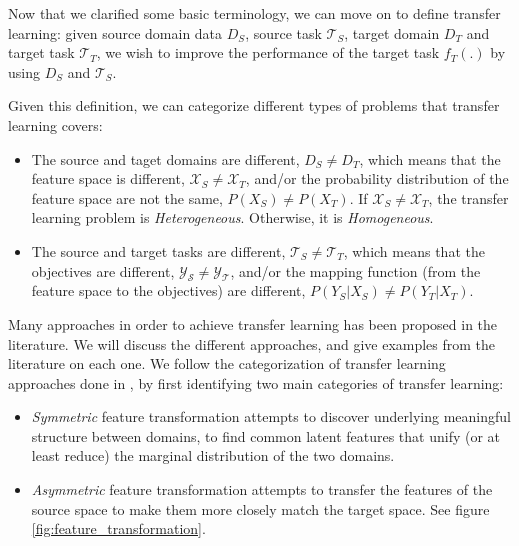   \par Now that we clarified some basic terminology, we can move on to define transfer learning: given source domain data $D_S$, source task $\mathcal{T}_S$,  target domain $D_T$ and target task $\mathcal{T}_T$, we wish to improve the performance of the target task $f_T(.)$ by using $D_S$ and $\mathcal{T}_S$.

  \par Given this definition, we can categorize different types of problems that transfer learning covers:

  \begin{itemize}
      \item The source and taget domains are different, $D_S \neq D_T$, which means that the feature space is different, $\mathcal{X}_S \neq \mathcal{X}_T$, and/or the probability distribution of the feature space are not the same, $P(X_S) \neq P(X_T)$. If $\mathcal{X}_S \neq \mathcal{X}_T$, the transfer learning problem is \textit{Heterogeneous}. Otherwise, it is \textit{Homogeneous}.

      \item The source and target tasks are different, $\mathcal{T}_S \neq \mathcal{T}_T$, which means that the objectives are different, $\mathcal{Y_S} \neq \mathcal{Y_T}$, and/or the mapping function (from the feature space to the objectives) are different, $P(Y_S|X_S) \neq P(Y_T|X_T)$.
  \end{itemize}

  \par Many approaches in order to achieve transfer learning has been proposed in the literature. We will discuss the different approaches, and give examples from the literature on each one. We follow the categorization of transfer learning approaches done in \citep{weiss2016survey}, by first identifying two main categories of transfer learning:
  \begin{itemize}
    \item \textit{Symmetric} feature transformation attempts to discover underlying meaningful structure between domains, to find common latent features that unify (or at least reduce) the marginal distribution of the two domains.

    \item \textit{Asymmetric} feature transformation attempts to transfer the features of the source space to make them more closely match the target space. See figure \ref{fig:feature_transformation}.
  \end{itemize}

